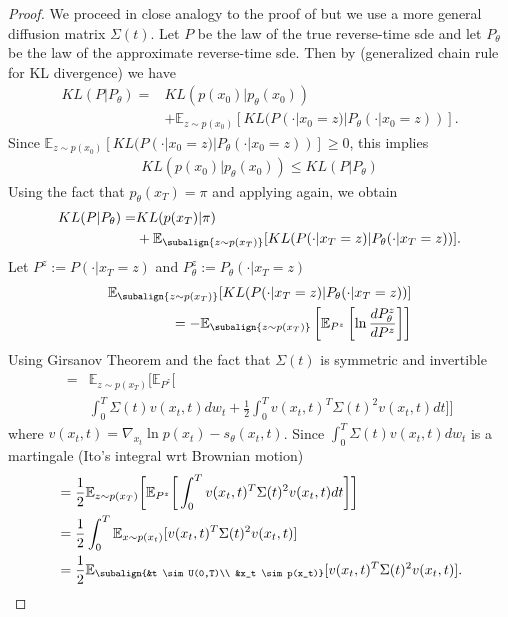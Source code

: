 \begin{proof}   
    We proceed in close analogy to the proof of \cite[Theorem 1]{song2021maximum} but we use a more general diffusion matrix $\Sigma(t)$. 
    Let $P$ be the law of the true reverse-time sde and let $P_\theta$ be the law of the approximate reverse-time sde. 
    Then by  \cite[Theorem 2.4]{leonard2013properties} (generalized chain rule for KL divergence) we have
    \begin{align*}
        KL(P | P_\theta) = &KL(p(x_0) | p_\theta(x_0)) 
        \\ &+  \mathbb{E}_{z \sim p(x_0)}[KL(P(\cdot | x_0=z) |P_\theta(\cdot | x_0=z))].
    \end{align*}
    Since $\mathbb{E}_{z \sim p(x_0)}[KL(P(\cdot | x_0=z) |P_\theta(\cdot | x_0=z))] \geq 0$, this implies 
    \begin{align*}
       KL(p(x_0) | p_\theta(x_0)) \leq KL(P | P_\theta) 
    \end{align*}
    Using the fact that $p_\theta(x_T) = \pi$ and applying \cite[Theorem 2.4]{leonard2013properties} again, we obtain
    \begin{align*}
        KL(P | P_\theta) =  &KL(p(x_T) |\pi) 
        \\ &+  \mathbb{E}_{\subalign{z \sim p(x_T)}}[KL(P(\cdot | x_T=z) |P_\theta(\cdot | x_T=z))].
    \end{align*}
    Let $P^z := P(\cdot | x_T=z)$ and $P_\theta^z := P_\theta(\cdot | x_T=z)$
    \begin{align*}
        \mathbb{E}_{\subalign{z \sim p(x_T)}}[KL(P(\cdot | x_T=z) |P_\theta(\cdot | x_T=z))]
        \\ =  - \mathbb{E}_{\subalign{z \sim p(x_T)}} \left[ 
            \mathbb{E}_{P^z} \left[
                \ln \frac{d P^z_\theta}{d P^z}
            \right]
        \right]
    \end{align*}
    Using Girsanov Theorem \cite[Theorem 8.6.5]{oksendal2003sde} and the fact that $\Sigma(t)$ is symmetric and invertible 
    \begin{align*}
     =  &\mathbb{E}_{z \sim p(x_T)}  \bigg[ 
            \mathbb{E}_{P^z} \bigg[\\
                    &\int_0^T  \Sigma(t) v(x_t,t) dw_t 
                    + \frac{1}{2} \int_0^T v(x_t,t)^T \Sigma(t)^2 v(x_t,t) dt 
            \bigg]
        \bigg]
    \end{align*}
    where $v(x_t,t)=\nabla_{x_t} \ln{p(x_t)} - s_\theta(x_t,t)$. Since $\int_0^T  \Sigma(t) v(x_t,t) dw_t $ is a martingale (Ito's integral wrt Brownian motion) 
    \begin{align*}
        &=  \frac{1}{2} \mathbb{E}_{z \sim p(x_T)}  \bigg[ 
            \mathbb{E}_{P^z} \bigg[
                     \int_0^T v(x_t,t)^T \Sigma(t)^2 v(x_t,t) dt 
            \bigg]
        \bigg] \\
        &= \frac{1}{2} \int_0^T \mathbb{E}_{x \sim p(x_t)}[ v(x_t,t)^T \Sigma(t)^2 v(x_t,t)] \\
        &= \frac{1}{2} \mathbb{E}_{\subalign{&t \sim U(0,T)\\ &x_t \sim p(x_t)}} 
        [
            v(x_t,t)^T \Sigma(t)^2 v(x_t,t)
        ].
    \end{align*}
\end{proof}

